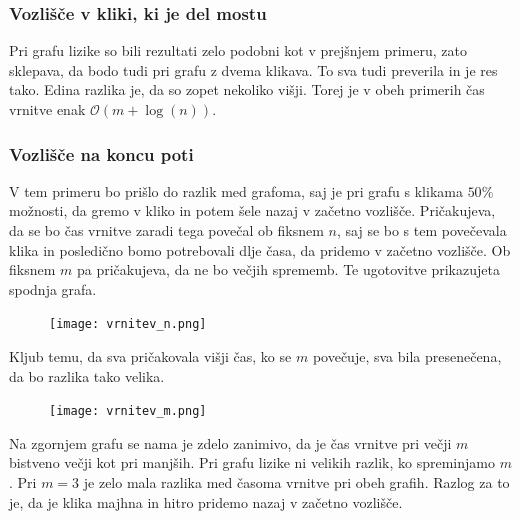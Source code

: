 \documentclass[12pt,a4paper]{amsart}
\begin{document}
\subsubsection{Vozlišče v kliki, ki je del mostu}
Pri grafu lizike so bili rezultati zelo podobni kot v prejšnjem primeru, zato sklepava, da bodo tudi pri grafu z dvema klikava.
To sva tudi preverila in je res tako. Edina razlika je, da so zopet nekoliko višji. Torej je v obeh primerih čas vrnitve enak
$\mathcal{O}(m+\log(n))$.

\subsubsection{Vozlišče na koncu poti}

V tem primeru bo prišlo do razlik med grafoma, saj je pri grafu s klikama $50 \%$ možnosti, da gremo v kliko in potem šele nazaj v 
začetno vozlišče. Pričakujeva, da se bo čas vrnitve zaradi tega povečal ob fiksnem $n$, saj se bo s tem povečevala klika in posledično
bomo potrebovali dlje časa, da pridemo v začetno vozlišče. Ob fiksnem $m$ pa pričakujeva, da ne bo večjih sprememb. 
Te ugotovitve prikazujeta spodnja grafa.

\begin{figure}[h]
\texttt{[image: vrnitev\_n.png]}
\end{figure}

Kljub temu, da sva pričakovala višji čas, ko se $m$ povečuje, sva bila presenečena, da bo razlika tako velika.

\begin{figure}[h]
\texttt{[image: vrnitev\_m.png]}
\end{figure}

Na zgornjem grafu se nama je zdelo zanimivo, da je čas vrnitve pri večji $m$ bistveno večji kot pri manjših. Pri grafu lizike
ni velikih razlik, ko spreminjamo $m$. Pri $m=3$ je zelo mala razlika med časoma vrnitve pri obeh grafih. Razlog za to je, da je 
klika majhna in hitro pridemo nazaj v začetno vozlišče.
\end{document}
